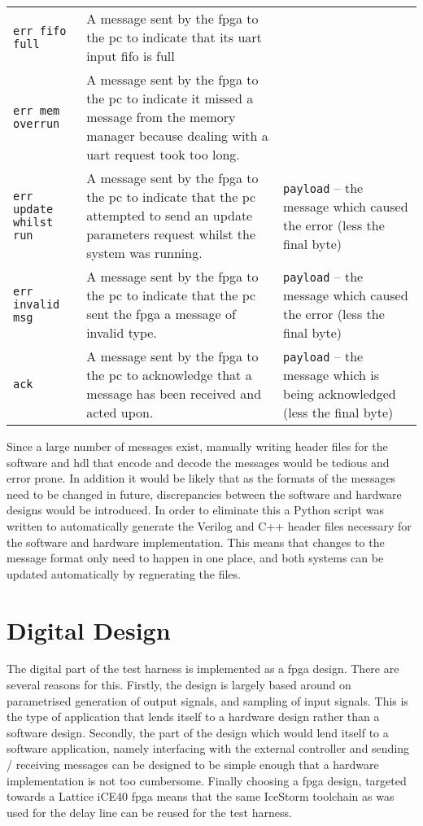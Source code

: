 \begin{longtable}{>{\raggedright}p{}  >{\raggedright}p{} >{\raggedright}p{} }
\texttt{err fifo full} & A message sent by the \gls{fpga} to the \gls{pc} to indicate that its \gls{uart} input \gls{fifo} is full& \tabularnewline

		
		\texttt{err mem overrun} & A message sent by the \gls{fpga} to the \gls{pc} to indicate it missed a message from the memory manager because dealing with a \gls{uart} request took too long.& \tabularnewline


\texttt{err update whilst run} & A message sent by the \gls{fpga} to the \gls{pc} to indicate that the \gls{pc} attempted to send an update parameters request whilst the system was running.& \texttt{payload} -- the message which caused the error (less the final byte) \tabularnewline


\texttt{err invalid msg} & A message sent by the \gls{fpga} to the \gls{pc} to indicate that the \gls{pc} sent the \gls{fpga} a message of invalid type.& \texttt{payload} -- the message which caused the error (less the final byte) \tabularnewline


\texttt{ack} & A message sent by the \gls{fpga} to the \gls{pc} to acknowledge that a message has been received and acted upon.& \texttt{payload} -- the message which is being acknowledged (less the final byte) \tabularnewline
	
\end{longtable}

Since a large number of messages exist, manually writing header files for the software and \gls{hdl} that encode and decode the messages would be tedious and error prone. In addition it would be likely that as the formats of the messages need to be changed in future, discrepancies between the software and hardware designs would be introduced. In order to eliminate this a Python script was written to automatically generate the Verilog and C++ header files necessary for the software and hardware implementation. This means that changes to the message format only need to happen in one place, and both systems can be updated automatically by regnerating the files.


\section{Digital Design} \label{sec:test-harness-dig}

The digital part of the test harness is implemented as a \gls{fpga} design. There are several reasons for this. Firstly, the design is largely based around on parametrised generation of output signals, and sampling of input signals. This is the type of application that lends itself to a hardware design rather than a software design. Secondly, the part of the design which would lend itself to a software application, namely interfacing with the external controller and sending / receiving messages can be designed to be simple enough that a hardware implementation is not too cumbersome. Finally choosing a \gls{fpga} design, targeted towards a Lattice iCE40 \gls{fpga} means that the same IceStorm toolchain as was used for the delay line can be reused for the test harness.

